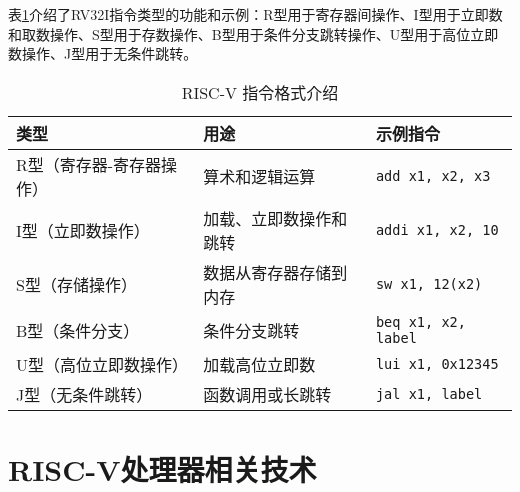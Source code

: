 表\ref{tab:riscv_instruction_formats}介绍了RV32I指令类型的功能和示例：R型用于寄存器间操作、I型用于立即数和取数操作、S型用于存数操作、B型用于条件分支跳转操作、U型用于高位立即数操作、J型用于无条件跳转。

\begin{table}[htbp]
	\centering
	\caption{RISC-V 指令格式介绍}
	\begin{tabularx}{\textwidth}{>{\centering\arraybackslash}X >{\centering\arraybackslash}X >{\centering\arraybackslash}X}
		\toprule
		\textbf{类型}   & \textbf{用途} & \textbf{示例指令}              \\
		\midrule
		R型（寄存器-寄存器操作） & 算术和逻辑运算     & \texttt{add x1, x2, x3}    \\
		I型（立即数操作）     & 加载、立即数操作和跳转 & \texttt{addi x1, x2, 10}   \\
		S型（存储操作）      & 数据从寄存器存储到内存 & \texttt{sw x1, 12(x2)}     \\
		B型（条件分支）      & 条件分支跳转      & \texttt{beq x1, x2, label} \\
		U型（高位立即数操作）   & 加载高位立即数     & \texttt{lui x1, 0x12345}   \\
		J型（无条件跳转）     & 函数调用或长跳转    & \texttt{jal x1, label}     \\
		\bottomrule
	\end{tabularx}
	\label{tab:riscv_instruction_formats}
\end{table}


\section{RISC-V处理器相关技术}